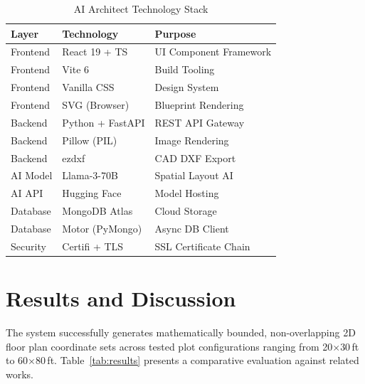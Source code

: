 \documentclass[10pt, twocolumn, letterpaper]{article}
\begin{document}
  \begin{table}[ht]
  \caption{AI Architect Technology Stack}
  \label{tab:stack}
  \centering
  \small
  \renewcommand{\arraystretch}{1.2}
  \begin{tabular}{|l|l|l|}
  \hline
  \textbf{Layer} & \textbf{Technology} & \textbf{Purpose} \\
  \hline
  Frontend & React 19 + TS   & UI Component Framework \\
  \hline
  Frontend & Vite 6          & Build Tooling \\
  \hline
  Frontend & Vanilla CSS     & Design System \\
  \hline
  Frontend & SVG (Browser)   & Blueprint Rendering \\
  \hline
  Backend  & Python + FastAPI & REST API Gateway \\
  \hline
  Backend  & Pillow (PIL)    & Image Rendering \\
  \hline
  Backend  & ezdxf           & CAD DXF Export \\
  \hline
  AI Model & Llama-3-70B     & Spatial Layout AI \\
  \hline
  AI API   & Hugging Face    & Model Hosting \\
  \hline
  Database & MongoDB Atlas   & Cloud Storage \\
  \hline
  Database & Motor (PyMongo) & Async DB Client \\
  \hline
  Security & Certifi + TLS   & SSL Certificate Chain \\
  \hline
  \end{tabular}
  \end{table}

  \section{Results and Discussion}

  The system successfully generates mathematically bounded, non-overlapping 2D
  floor plan coordinate sets across tested plot configurations ranging from
  20$\times$30\,ft to 60$\times$80\,ft. Table~\ref{tab:results} presents a
  comparative evaluation against related works.
\end{document}
